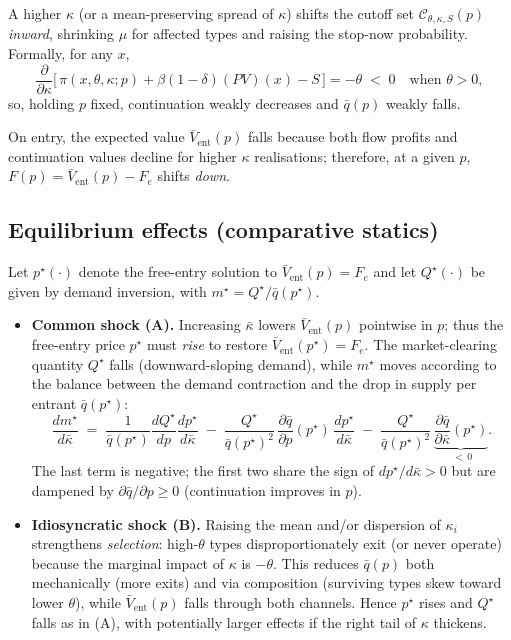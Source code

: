 \documentclass[11pt]{article}
\begin{document}
A higher $\kappa$ (or a mean-preserving spread of $\kappa$) shifts the cutoff set $\mathcal{C}_{\theta,\kappa,S}(p)$ \emph{inward}, shrinking $\mu$ for affected types and raising the stop-now probability. Formally, for any $x$,
\[
\frac{\partial}{\partial\kappa}\Big[\,\pi(x,\theta,\kappa;p) + \beta(1-\delta)(PV)(x) - S\,\Big] = -\theta \;<\; 0 \quad\text{when }\theta>0,
\]
so, holding $p$ fixed, continuation weakly decreases and $\bar q(p)$ weakly falls.

On entry, the expected value $\bar V_{\text{ent}}(p)$ falls because both flow profits and continuation values decline for higher $\kappa$ realisations; therefore, at a given $p$, $F(p)=\bar V_{\text{ent}}(p)-F_e$ shifts \emph{down}.

\subsection{Equilibrium effects (comparative statics)}

Let $p^\star(\cdot)$ denote the free-entry solution to $\bar V_{\text{ent}}(p)=F_e$ and let $Q^\star(\cdot)$ be given by demand inversion, with $m^\star=Q^\star/\bar q(p^\star)$.

\begin{itemize}
\item \textbf{Common shock (A).} Increasing $\bar\kappa$ lowers $\bar V_{\text{ent}}(p)$ pointwise in $p$; thus the free-entry price $p^\star$ must \emph{rise} to restore $\bar V_{\text{ent}}(p^\star)=F_e$. The market-clearing quantity $Q^\star$ falls (downward-sloping demand), while $m^\star$ moves according to the balance between the demand contraction and the drop in supply per entrant $\bar q(p^\star)$:
\[
\frac{d m^\star}{d\bar\kappa}
\;=\;
\frac{1}{\bar q(p^\star)}\frac{dQ^\star}{dp}\frac{dp^\star}{d\bar\kappa}
\;-\;
\frac{Q^\star}{\bar q(p^\star)^2}\,\frac{\partial \bar q}{\partial p}(p^\star)\,\frac{dp^\star}{d\bar\kappa}
\;-\;
\frac{Q^\star}{\bar q(p^\star)^2}\,\underbrace{\frac{\partial \bar q}{\partial \bar\kappa}(p^\star)}_{\;<\,0}.
\]
The last term is negative; the first two share the sign of $dp^\star/d\bar\kappa>0$ but are dampened by $\partial\bar q/\partial p\ge 0$ (continuation improves in $p$).

\item \textbf{Idiosyncratic shock (B).} Raising the mean and/or dispersion of $\kappa_i$ strengthens \emph{selection}: high-$\theta$ types disproportionately exit (or never operate) because the marginal impact of $\kappa$ is $-\theta$. This reduces $\bar q(p)$ both mechanically (more exits) and via composition (surviving types skew toward lower $\theta$), while $\bar V_{\text{ent}}(p)$ falls through both channels. Hence $p^\star$ rises and $Q^\star$ falls as in (A), with potentially larger effects if the right tail of $\kappa$ thickens.
\end{itemize}
\end{document}

